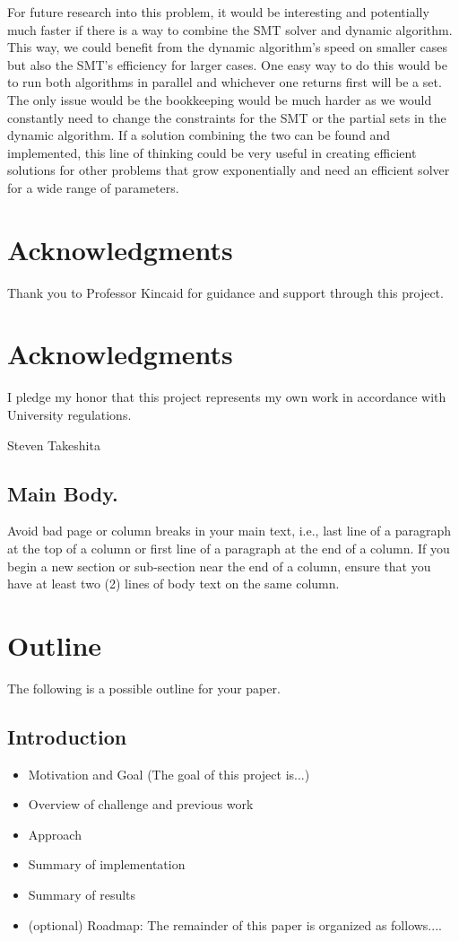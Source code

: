 \documentclass[pageno]{jpaper}
\begin{document}
For future research into this problem, it would be interesting and potentially much faster if there is a way to combine the SMT solver and dynamic algorithm. This way, we could benefit from the dynamic algorithm's speed on smaller cases but also the SMT's efficiency for larger cases. One easy way to do this would be to run both algorithms in parallel and whichever one returns first will be a set. The only issue would be the bookkeeping would be much harder as we would constantly need to change the constraints for the SMT or the partial sets in the dynamic algorithm. If a solution combining the two can be found and implemented, this line of thinking could be very useful in creating efficient solutions for other problems that grow exponentially and need an efficient solver for a wide range of parameters. 

\section{Acknowledgments}

Thank you to Professor Kincaid for guidance and support through this project. 

\section{Acknowledgments}

I pledge my honor that this project represents my own work in accordance with University regulations.

Steven Takeshita




\subsection{Main Body.}

Avoid bad page or column breaks in
your main text, i.e., last line of a paragraph at the top of a
column or first line of a paragraph at the end of a column. If you
begin a new section or sub-section near the end of a column,
ensure that you have at least two (2)  lines of body text on the same
column. 

\section{Outline}  
The following is a possible outline for your paper.
\subsection{Introduction}
\begin{itemize}
\item Motivation and Goal (The goal of this project is...)
\item Overview of challenge and previous work 
\item Approach 
\item Summary of implementation
\item Summary of results
\item (optional) Roadmap: The remainder of this paper is organized as follows....
\end{itemize}
\end{document}
